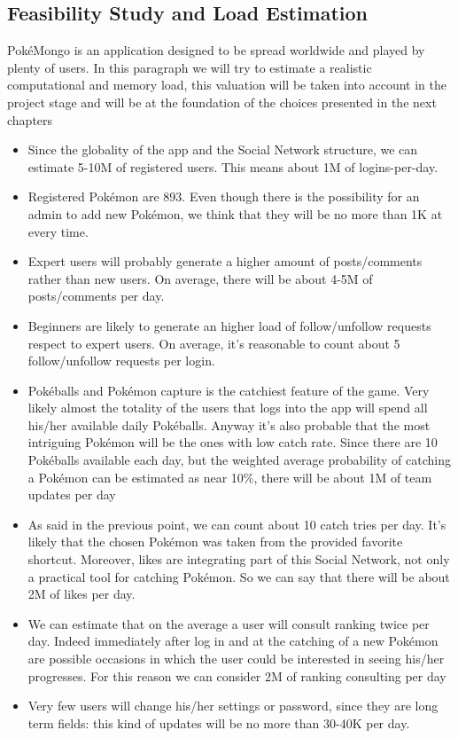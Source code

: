 \subsection{Feasibility Study and Load Estimation}
PokéMongo is an application designed to be spread worldwide and played by plenty of users. In this paragraph we will try to estimate a realistic computational and memory load, this valuation will be taken into account in the project stage and will be at the foundation of the choices presented in the next chapters

\begin{itemize}
	\item Since the globality of the app and the Social Network structure, we can estimate 5-10M of registered users. This means about 1M of logins-per-day.
	\item Registered Pokémon are 893. Even though there is the possibility for an admin to add new Pokémon, we think that they will be no more than 1K at every time.
	\item Expert users will probably generate a higher amount of posts/comments rather than new users. On average, there will be about 4-5M of posts/comments per day.
	\item Beginners are likely to generate an higher load of follow/unfollow requests respect to expert users. On average, it’s reasonable to count about 5 follow/unfollow requests per login.
	\item Pokéballs and Pokémon capture is the catchiest feature of the game. Very likely almost the totality of the users that logs into the app will spend all his/her available daily Pokéballs. Anyway it’s also probable that the most intriguing Pokémon will be the ones with low catch rate. Since there are 10 Pokéballs available each day, but the weighted average probability of catching a Pokémon can be estimated as near 10\%, there will be about 1M of team updates per day
	\item As said in the previous point, we can count about 10 catch tries per day. It’s likely that the chosen Pokémon was taken from the provided favorite shortcut. Moreover, likes are integrating part of this Social Network, not only a practical tool for catching Pokémon. So we can say that there will be about 2M of likes per day.
	\item We can estimate that on the average a user will consult ranking twice per day. Indeed immediately after log in and at the catching of a new Pokémon are possible occasions in which the user could be interested in seeing his/her progresses. For this reason we can consider 2M of ranking consulting per day
	\item Very few users will change his/her settings or password, since they are long term fields: this kind of updates will be no more than 30-40K per day.
\end{itemize}

